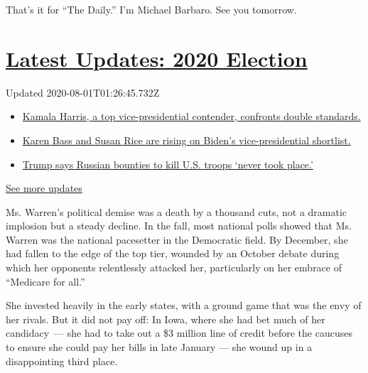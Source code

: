 That's it for ``The Daily.'' I'm Michael Barbaro. See you tomorrow.

\hypertarget{latest-updates-2020-election}{%
\section{\texorpdfstring{\href{https://www.nytimes.com/2020/07/31/us/elections/biden-vs-trump.html?action=click\&pgtype=Article\&state=default\&region=MAIN_CONTENT_1\&context=storylines_live_updates}{Latest
Updates: 2020
Election}}{Latest Updates: 2020 Election}}\label{latest-updates-2020-election}}

Updated 2020-08-01T01:26:45.732Z

\begin{itemize}
\tightlist
\item
  \href{https://www.nytimes.com/2020/07/31/us/elections/biden-vs-trump.html?action=click\&pgtype=Article\&state=default\&region=MAIN_CONTENT_1\&context=storylines_live_updates\#link-29fdff45}{Kamala
  Harris, a top vice-presidential contender, confronts double
  standards.}
\item
  \href{https://www.nytimes.com/2020/07/31/us/elections/biden-vs-trump.html?action=click\&pgtype=Article\&state=default\&region=MAIN_CONTENT_1\&context=storylines_live_updates\#link-13ec3d9c}{Karen
  Bass and Susan Rice are rising on Biden's vice-presidential
  shortlist.}
\item
  \href{https://www.nytimes.com/2020/07/31/us/elections/biden-vs-trump.html?action=click\&pgtype=Article\&state=default\&region=MAIN_CONTENT_1\&context=storylines_live_updates\#link-49e9a016}{Trump
  says Russian bounties to kill U.S. troops `never took place.'}
\end{itemize}

\href{https://www.nytimes.com/2020/07/31/us/elections/biden-vs-trump.html?action=click\&pgtype=Article\&state=default\&region=MAIN_CONTENT_1\&context=storylines_live_updates}{See
more updates}

Ms. Warren's political demise was a death by a thousand cuts, not a
dramatic implosion but a steady decline. In the fall, most national
polls showed that Ms. Warren was the national pacesetter in the
Democratic field. By December, she had fallen to the edge of the top
tier, wounded by an October debate during which her opponents
relentlessly attacked her, particularly on her embrace of ``Medicare for
all.''

She invested heavily in the early states, with a ground game that was
the envy of her rivals. But it did not pay off: In Iowa, where she had
bet much of her candidacy~--- she had to take out a \$3 million line of
credit before the caucuses to ensure she could pay her bills in late
January --- she wound up in a disappointing third place.


